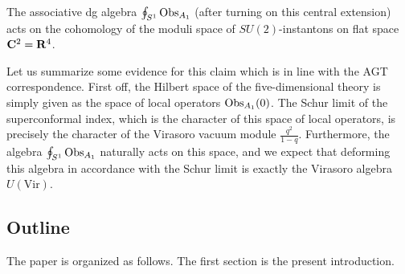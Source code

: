 \begin{conj}
The associative dg algebra $\oint_{S^1} \operatorname{Obs}_{A_1}$ (after turning on this central extension) acts on the cohomology of the moduli space of $SU(2)$-instantons on flat space~$\mathbf{C}^2 = \mathbf{R}^4$. 
\end{conj}

Let us summarize some evidence for this claim which is in line with the AGT correspondence. 
First off, the Hilbert space of the five-dimensional theory is simply given as the space of local operators $\operatorname{Obs}_{A_1}(0)$.
The Schur limit of the superconformal index, which is the character of this space of local operators, is precisely the character of the Virasoro vacuum module $\frac{q^2}{1-q}$.
Furthermore, the algebra $\oint_{S^1} \operatorname{Obs}_{A_1}$ naturally acts on this space, and we expect that deforming this algebra in accordance with the Schur limit is exactly the Virasoro algebra $U(\text{Vir})$.

\subsection{Outline}

The paper is organized as follows. The first section is the present introduction.

%
